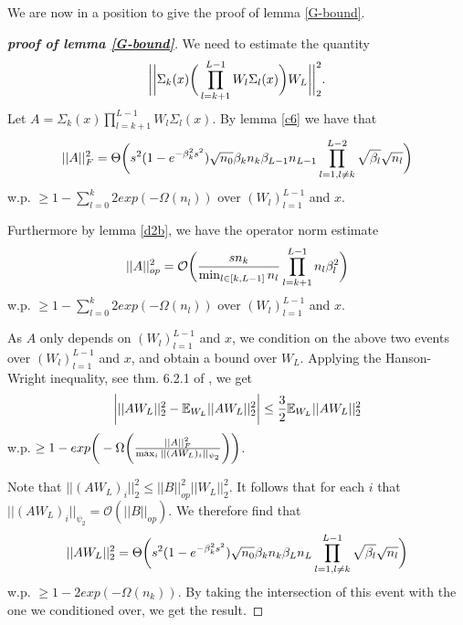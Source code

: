 \documentclass{article}
\theoremstyle{plain}
\theoremstyle{definition}
\theoremstyle{remark}
\begin{document}
We are now in a position to give the proof of lemma \ref{G-bound}.


\begin{proof}[\textbf{proof of lemma \ref{G-bound}}]

We need to estimate the quantity 
\begin{equation*}
\bigg{\vert}\bigg{\vert}
\Sigma_k(x)\bigg{(}\prod_{l=k+1}^{L-1}W_l\Sigma_l(x)\bigg{)}W_L
\bigg{\vert}\bigg{\vert}^2_2.
\end{equation*}
Let $A = \Sigma_k(x)\prod_{l=k+1}^{L-1}W_l\Sigma_l(x)$. By lemma \ref{c6}
we have that
\begin{equation*}
\vert\vert A\vert\vert_F^2 = 
\Theta\bigg{(}
s^2(1 - e^{-\beta_k^2s^2})\sqrt{n_0}\beta_kn_k\beta_{L-1}n_{L-1}
\prod_{l=1, l\neq k}^{L-2}
\sqrt{\beta_l}\sqrt{n_l}
\bigg{)}
\end{equation*}
w.p. $\geq 1 - \sum_{l=0}^k2exp(-\Omega(n_l))$ over $(W_{l})_{l=1}^{L-1}$ and 
$x$.

Furthermore by lemma \ref{d2b}, we have the operator norm estimate
\begin{equation*}
\vert\vert A\vert\vert_{op}^2 = \mathcal{O}\bigg{(}
\frac{sn_k}{\min_{l \in [k,L-1]}n_l}\prod_{l=k+1}^{L-1}n_l\beta_l^2
\bigg{)}
\end{equation*}
w.p. $\geq 1 - \sum_{l=0}^k2exp(-\Omega(n_l))$ over $(W_{l})_{l=1}^{L-1}$ and 
$x$.

As $A$ only depends on $(W_{l})_{l=1}^{L-1}$ and $x$, we condition on the above two events over $(W_{l})_{l=1}^{L-1}$ and $x$, and obtain a bound over $W_L$. 
Applying the Hanson-Wright 
inequality, see thm. 6.2.1 of \cite{vershynin2018high}, we get
\begin{equation*}
\bigg{\vert}
\vert\vert AW_L\vert\vert_2^2 - \mathbb{E}_{W_L}\vert\vert AW_L\vert\vert^2_2
\bigg{\vert}
\leq 
\frac{3}{2}
\mathbb{E}_{W_L}\vert\vert AW_L\vert\vert^2_2
\end{equation*}
w.p. $\geq 1 - exp\bigg{(}-\Omega\bigg{(}\frac{\vert\vert A\vert\vert_F^2}
{\max_{i}\vert\vert (AW_L)_i\vert\vert_{\psi_2}}\bigg{)}\bigg{)}$.

Note that $\vert\vert (AW_L)_i\vert\vert_{2}^2 \leq 
\vert\vert B\vert\vert_{op}^2\vert\vert W_L\vert\vert_2^2$. It follows that
for each $i$ that 
$\vert\vert (AW_L)_i\vert\vert_{\psi_2} = 
\mathcal{O}(\vert\vert B\vert\vert_{op})$. We therefore find that
\begin{equation*}
\vert\vert AW_L\vert\vert_2^2 = 
\Theta\bigg{(}
s^2(1 - e^{-\beta_k^2s^2})\sqrt{n_0}\beta_kn_k\beta_{L}n_L
\prod_{l=1, l\neq k}^{L-1}
\sqrt{\beta_l}\sqrt{n_l}
\bigg{)}
\end{equation*}
w.p. $\geq 1 - 2exp(-\Omega(n_k))$. By taking the intersection of this event with the one we conditioned over, we get the result.
\end{proof}
\end{document}
